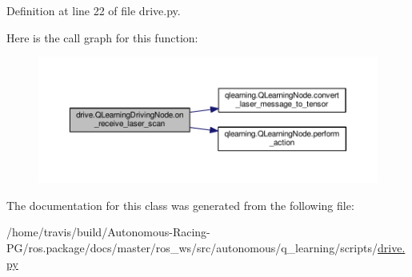 Definition at line 22 of file drive.\+py.



Here is the call graph for this function\+:
\nopagebreak
\begin{figure}[H]
\begin{center}
\leavevmode
\includegraphics[width=350pt]{classdrive_1_1_q_learning_driving_node_a2235c596e4d1f3f8d3c535abe2a1af2c_cgraph}
\end{center}
\end{figure}




The documentation for this class was generated from the following file\+:\begin{DoxyCompactItemize}
\item 
/home/travis/build/\+Autonomous-\/\+Racing-\/\+P\+G/ros.\+package/docs/master/ros\+\_\+ws/src/autonomous/q\+\_\+learning/scripts/\hyperlink{drive_8py}{drive.\+py}\end{DoxyCompactItemize}
